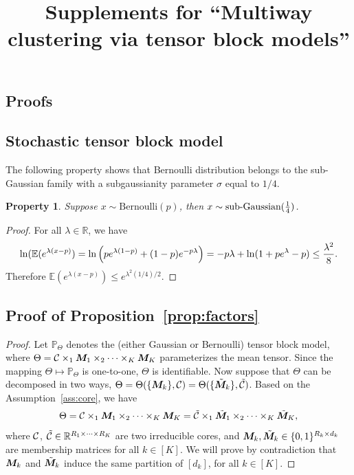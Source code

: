 \documentclass{article}
\title{Supplements for ``Multiway clustering via tensor block models''}
\newtheorem{property}{Property}
\begin{document}
\maketitle

\vspace{-2cm}
\begin{appendices}
\section{Proofs}
\subsection{Stochastic tensor block model}
The following property shows that Bernoulli distribution belongs to the sub-Gaussian family with a subgaussianity parameter $\sigma$ equal to $1/4$.
\begin{property}
Suppose $x \sim \text{Bernoulli}(p)$, then $x\sim \text{sub-Gaussian}({1\over 4})$.
\end{property}
\begin{proof} For all $\lambda \in \mathbb{R}$, we have
\[
\ln(\mathbb{E}(e^{\lambda(x-p)})=\ln\left(pe^{\lambda(1-p)} +(1-p)e^{-p\lambda}\right)=-p\lambda +\ln (1+pe^\lambda  -p)\leq {\lambda ^2\over 8}.
\]
Therefore $\mathbb{E}(e^{\lambda (x-p)})\leq e^{\lambda^2(1/4)/2}$.
\end{proof}

\subsection{Proof of Proposition~\ref{prop:factors}}
\begin{proof}
Let $\mathbb{P}_{\Theta}$ denotes the (either Gaussian or Bernoulli) tensor block model, where $\Theta=\mathcal{C} \times_1\bm M_1\times_2\cdots\times_K\bm M_K$ parameterizes the mean tensor. Since the mapping $\Theta\mapsto\mathbb{P}_{\Theta}$ is one-to-one, $\Theta$ is identifiable. Now suppose that $\Theta$ can be decomposed in two ways, $\Theta=\Theta(\{\bm M_k\}, \mathcal{C})=\Theta(\{\tilde {\bm M}_k\}, \tilde {\mathcal{C}})$. Based on the Assumption~\ref{ass:core}, we have
\begin{equation}\label{eq:equality}
\Theta=\mathcal{C} \times_1\bm M_1\times_2\cdots\times_K\bm M_K=\tilde {\mathcal{C}} \times_1\tilde {\bm M}_1\times_2\cdots\times_K\tilde  {\bm M}_K,
\end{equation}
where $\mathcal{C}$, $\tilde {\mathcal{C}}\in\mathbb{R}^{R_1\times \cdots \times R_K}$ are two irreducible cores, and $\bm M_k,\tilde {\bm M}_k\in\{0,1\}^{R_k\times d_k}$ are membership matrices for all $k\in[K]$. We will prove by contradiction that $\bm M_k$ and $\tilde {\bm M}_k$ induce the same partition of $[d_k]$, for all $k\in[K]$. 


\end{proof}
\end{appendices}
\end{document}
